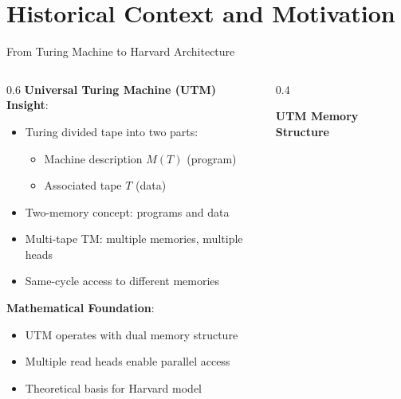 \documentclass[aspectratio=169]{beamer}
\newcommand{\concept}[1]{\textbf{\color{darkblue}#1}}
\begin{document}
\section{Historical Context and Motivation}

\begin{frame}{From Turing Machine to Harvard Architecture}
\begin{columns}
\begin{column}{0.6\textwidth}
\concept{Universal Turing Machine (UTM) Insight}:
\begin{itemize}
\item Turing divided tape into two parts:
\begin{itemize}
\item Machine description $M(T)$ (program)
\item Associated tape $T$ (data)
\end{itemize}
\item Two-memory concept: programs and data
\item Multi-tape TM: multiple memories, multiple heads
\item Same-cycle access to different memories
\end{itemize}

\vspace{0.3cm}
\concept{Mathematical Foundation}:
\begin{itemize}
\item UTM operates with dual memory structure
\item Multiple read heads enable parallel access
\item Theoretical basis for Harvard model
\end{itemize}
\end{column}
\begin{column}{0.4\textwidth}
\begin{center}
\textbf{UTM Memory Structure}
\vspace{0.3cm}

\end{center}
\end{column}
\end{columns}
\end{frame}
\end{document}
